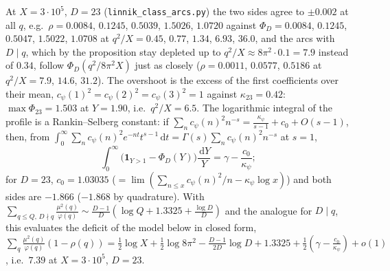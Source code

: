 ﻿\documentclass[11pt]{amsart}
\theoremstyle{remark}
\newcommand{\dd}{\,\mathrm d}
\begin{document}
At $X=3\cdot10^5$, $D=23$ (\texttt{linnik\_class\_arcs.py}) the two sides agree to $\pm0.002$ at all $q$, e.g.\ $\rho=0.0084$, $0.1245$, $0.5039$, $1.5026$, $1.0720$ against $\Phi_D=0.0084$, $0.1245$, $0.5047$, $1.5022$, $1.0708$ at $q^2/X=0.45$, $0.77$, $1.34$, $6.93$, $36.0$, and the arcs with $D\mid q$, which by the proposition stay depleted up to $q^2/X\approx8\pi^2\cdot0.1=7.9$ instead of $0.34$, follow $\Phi_D(q^2/8\pi^2X)$ just as closely ($\rho=0.0011$, $0.0577$, $0.5186$ at $q^2/X=7.9$, $14.6$, $31.2$). The overshoot is the excess of the first coefficients over their mean, $c_\psi(1)^2=c_\psi(2)^2=c_\psi(3)^2=1$ against $\kappa_{23}=0.42$: $\max\Phi_{23}=1.503$ at $Y=1.90$, i.e.\ $q^2/X=6.5$. The logarithmic integral of the profile is a Rankin--Selberg constant: if $\sum_nc_\psi(n)^2n^{-s}=\frac{\kappa_\psi}{s-1}+c_0+O(s-1)$, then, from $\int_0^\infty\sum_nc_\psi(n)^2e^{-nt}t^{s-1}\dd t=\Gamma(s)\sum_nc_\psi(n)^2n^{-s}$ at $s=1$,
\[
\int_0^\infty\bigl(\mathbf 1_{Y>1}-\Phi_D(Y)\bigr)\frac{\dd Y}Y=\gamma-\frac{c_0}{\kappa_\psi};
\]
for $D=23$, $c_0=1.03035$ ($=\lim(\sum_{n\le x}c_\psi(n)^2/n-\kappa_\psi\log x)$) and both sides are $-1.866$ ($-1.868$ by quadrature). With $\sum_{q\le Q,\,D\nmid q}\frac{\mu^2(q)}{\varphi(q)}\sim\frac{D-1}D(\log Q+1.3325+\frac{\log D}D)$ and the analogue for $D\mid q$, this evaluates the deficit of the model below in closed form, $\sum_q\frac{\mu^2(q)}{\varphi(q)}(1-\rho(q))=\frac12\log X+\frac12\log8\pi^2-\frac{D-1}{2D}\log D+1.3325+\frac12(\gamma-\frac{c_0}{\kappa_\psi})+o(1)$, i.e.\ $7.39$ at $X=3\cdot10^5$, $D=23$.
\end{document}
